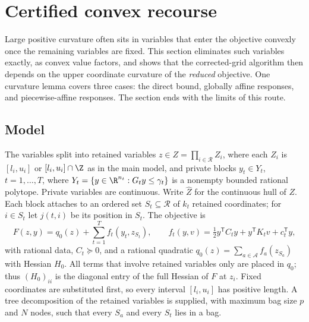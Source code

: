 
\section{Certified convex recourse}\label{sec:cr}

Large positive curvature often sits in variables that enter the objective
convexly once the remaining variables are fixed. This section eliminates such
variables exactly, as convex value factors, and shows that the
corrected-grid algorithm then depends on the upper coordinate curvature of
the \emph{reduced} objective. One curvature lemma covers three cases: the
direct bound, globally affine responses, and piecewise-affine responses.
The section ends with the limits of this route.

\subsection{Model}

\begin{definition}\label{def:cr-model}
The variables split into retained variables $z\in Z=\prod_{i\in\mathcal R}Z_i$,
where each $Z_i$ is $[l_i,u_i]$ or $[l_i,u_i]\cap\Z$ as in the main model, and
private blocks $y_t\in Y_t$, $t=1,\ldots,T$, where
$Y_t=\{y\in\R^{n_t}:G_ty\le\gamma_t\}$ is a nonempty bounded rational polytope.
Private variables are continuous. Write $\widehat Z$ for the continuous hull of
$Z$. Each block attaches to an ordered set $S_t\subseteq\mathcal R$ of
$k_t$ retained coordinates; for $i\in S_t$ let $j(t,i)$ be its position in
$S_t$. The objective is
\begin{equation}\label{eq:cr-model}
F(z,y)=q_0(z)+\sum_{t=1}^T f_t(y_t,z_{S_t}),\qquad
f_t(y,v)=\tfrac12y^{\mathsf T}C_ty+y^{\mathsf T}K_tv+c_t^{\mathsf T}y,
\end{equation}
with rational data, $C_t\succeq0$, and a rational quadratic
$q_0(z)=\sum_{a\in\mathcal A}f_a(z_{S_a})$ with Hessian $H_0$. All terms that
involve retained variables only are placed in $q_0$; thus $(H_0)_{ii}$ is the
diagonal entry of the full Hessian of $F$ at $z_i$. Fixed coordinates are
substituted first, so every interval $[l_i,u_i]$ has positive length.
A tree decomposition of the retained variables is supplied, with maximum bag
size $p$ and $N$ nodes, such that every $S_a$ and every $S_t$ lies in a bag.
\end{definition}

